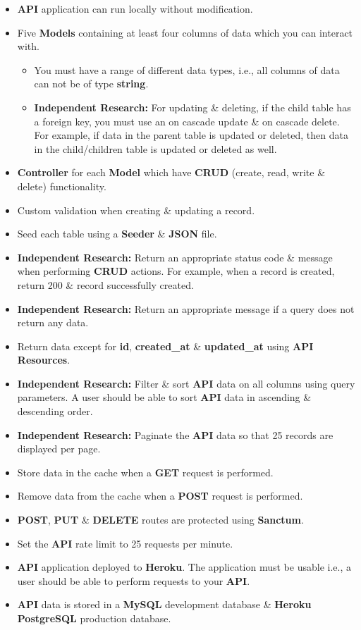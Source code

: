 \documentclass{article}
\begin{document}
\begin{itemize}
	\item \textbf{API} application can run locally without modification.
	\item Five \textbf{Models} containing at least four columns of data which you can interact with. 
	\begin{itemize}
    \item You must have a range of different data types, i.e., all columns of data can not be of type \textbf{string}.
    \item \textbf{Independent Research:} For updating \& deleting, if the child table has a foreign key, you must use an on cascade update \& on cascade delete. For example, if data in the parent table is updated or deleted, then data in the child/children table is updated or deleted as well.
  \end{itemize}
	\item \textbf{Controller} for each \textbf{Model} which have \textbf{CRUD} (create, read, write \& delete) functionality. 
	\item Custom validation when creating \& updating a record. 
	\item Seed each table using a \textbf{Seeder} \& \textbf{JSON} file.
	\item \textbf{Independent Research:} Return an appropriate status code \& message when performing \textbf{CRUD} actions. For example, when a record is created, return 200 \& record successfully created. 
  \item \textbf{Independent Research:} Return an appropriate message if a query does not return any data.
	\item Return data except for \textbf{id}, \textbf{created\_at} \& \textbf{updated\_at} using \textbf{API Resources}.
	\item \textbf{Independent Research:} Filter \& sort \textbf{API} data on all columns using query parameters. A user should be able to sort \textbf{API} data in ascending \& descending order.
	\item \textbf{Independent Research:} Paginate the \textbf{API} data so that 25 records are displayed per page.
	\item Store data in the cache when a \textbf{GET} request is performed. 
	\item Remove data from the cache when a \textbf{POST} request is performed.  
	\item \textbf{POST}, \textbf{PUT} \& \textbf{DELETE} routes are protected using \textbf{Sanctum}.
	\item Set the \textbf{API} rate limit to 25 requests per minute.
	\item \textbf{API} application deployed to \textbf{Heroku}. The application must be usable i.e., a user should be able to perform requests to your \textbf{API}.
	\item \textbf{API} data is stored in a \textbf{MySQL} development database \& \textbf{Heroku PostgreSQL} production database.	
\end{itemize}
\end{document}
